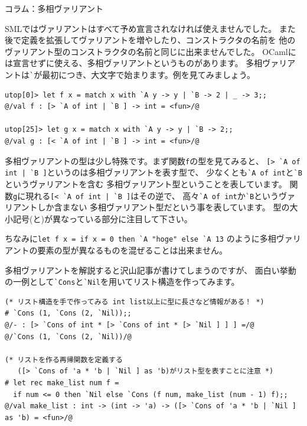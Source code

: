 \documentclass[11pt,a4paper]{article}
\begin{document}
\begin{itembox}[l]{コラム：多相ヴァリアント}

SMLではヴァリアントはすべて予め宣言されなければ使えませんでした。
また後で定義を拡張してヴァリアントを増やしたり、コンストラクタの名前を
他のヴァリアント型のコンストラクタの名前と同じに出来ませんでした。
OCaml\cite{ocaml}には宣言せずに使える、多相ヴァリアントというものがあります。
多相ヴァリアントは\lstinline{`}が最初につき、大文字で始まります。例を見てみましょう。

\begin{lstlisting}[caption=多相ヴァリアント,label=code:poly-varinat]
utop[0]> let f x = match x with `A y -> y | `B -> 2 | _ -> 3;;
@/val f : [> `A of int | `B ] -> int = <fun>/@

utop[25]> let g x = match x with `A y -> y | `B -> 2;;
@/val g : [< `A of int | `B ] -> int = <fun>/@
\end{lstlisting}

多相ヴァリアントの型は少し特殊です。まず関数\lstinline{f}の型を見てみると、
\lstinline{[> `A of int | `B ]}というのは多相ヴァリアントを表す型で、
少なくとも\lstinline{`A of int}と\lstinline{`B}というヴァリアントを含む
多相ヴァリアント型ということを表しています。
関数\lstinline{g}に現れる\lstinline{[< `A of int | `B ]}はその逆で、
高々\lstinline{`A of int}か\lstinline{`B}というヴァリアントしか含まない
多相ヴァリアント型だという事を表しています。
型の大小記号(\prog{>}と\prog{<})が異なっている部分に注目して下さい。

ちなみに\lstinline{let f x = if x = 0 then `A "hoge" else `A 13}
のように多相ヴァリアントの要素の型が異なるものを混ぜることは出来ません。

多相ヴァリアントを解説すると沢山記事が書けてしまうのですが、
面白い挙動の一例として\lstinline{`Cons}と\lstinline{`Nil}を用いてリスト構造を作ってみます。

\begin{lstlisting}[caption=多相ヴァリアントを用いたリスト構造(ocamlコード)]
(* リスト構造を手で作ってみる int list以上に型に長さなど情報がある！ *)
# `Cons (1, `Cons (2, `Nil));;
@/- : [> `Cons of int * [> `Cons of int * [> `Nil ] ] ] =/@
@/`Cons (1, `Cons (2, `Nil))/@

(* リストを作る再帰関数を定義する
   ([> `Cons of 'a * 'b | `Nil ] as 'b)がリスト型を表すことに注意 *)
# let rec make_list num f =
  if num <= 0 then `Nil else `Cons (f num, make_list (num - 1) f);;
@/val make_list : int -> (int -> 'a) -> ([> `Cons of 'a * 'b | `Nil ] as 'b) = <fun>/@


\end{lstlisting}
\end{itembox}
\end{document}
